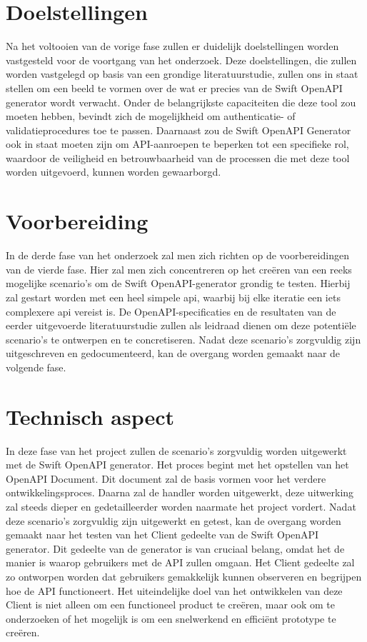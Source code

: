 \section{Doelstellingen}
Na het voltooien van de vorige fase zullen er duidelijk doelstellingen worden vastgesteld voor de voortgang van het onderzoek. Deze doelstellingen, die zullen worden vastgelegd op basis van een grondige literatuurstudie, zullen ons in staat stellen om een beeld te vormen over de wat er precies van de Swift OpenAPI generator wordt verwacht. Onder de belangrijkste capaciteiten die deze tool zou moeten hebben, bevindt zich de mogelijkheid om authenticatie- of validatieprocedures toe te passen. Daarnaast zou de Swift OpenAPI Generator ook in staat moeten zijn om API-aanroepen te beperken tot een specifieke rol, waardoor de veiligheid en betrouwbaarheid van de processen die met deze tool worden uitgevoerd, kunnen worden gewaarborgd.

\section{Voorbereiding}
In de derde fase van het onderzoek zal men zich richten op de voorbereidingen van de vierde fase. Hier zal men zich concentreren op het creëren van een reeks mogelijke scenario's om de Swift OpenAPI-generator grondig te testen. Hierbij zal gestart worden met een heel simpele api, waarbij bij elke iteratie een iets complexere api vereist is. De OpenAPI-specificaties en de resultaten van de eerder uitgevoerde literatuurstudie zullen als leidraad dienen om deze potentiële scenario's te ontwerpen en te concretiseren. Nadat deze scenario’s zorgvuldig zijn uitgeschreven en gedocumenteerd, kan de overgang worden gemaakt naar de volgende fase. 

\section{Technisch aspect}
In deze fase van het project zullen de scenario's zorgvuldig worden uitgewerkt met de Swift OpenAPI generator. Het proces begint met het opstellen van het OpenAPI Document. Dit document zal de basis vormen voor het verdere ontwikkelingsproces. Daarna zal de handler worden uitgewerkt, deze uitwerking zal steeds dieper en gedetailleerder worden naarmate het project vordert.
Nadat deze scenario's zorgvuldig zijn uitgewerkt en getest, kan de overgang worden gemaakt naar het testen van het Client gedeelte van de Swift OpenAPI generator. Dit gedeelte van de generator is van cruciaal belang, omdat het de manier is waarop gebruikers met de API zullen omgaan. Het Client gedeelte zal zo ontworpen worden dat gebruikers gemakkelijk kunnen observeren en begrijpen hoe de API functioneert.
Het uiteindelijke doel van het ontwikkelen van deze Client is niet alleen om een functioneel product te creëren, maar ook om te onderzoeken of het mogelijk is om een snelwerkend en efficiënt prototype te creëren. 

